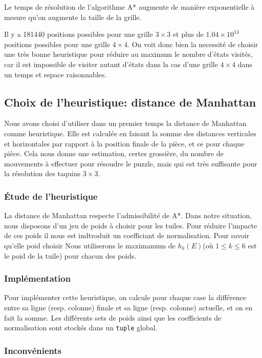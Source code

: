 \documentclass[a4paper, 12pt]{article}
\begin{document}
    Le temps de résolution de l'algorithme A* augmente de manière exponentielle à mesure qu'on augmente la taille de la grille.
    
    Il y a 181440 positions possibles pour une grille $3 \times 3$ et plus de $1.04 \times 10^{13}$ positions possibles pour une grille $4 \times 4$.
    On voit donc bien la necessité de choisir une très bonne heuristique pour réduire au maximum le nombre d'états visités, car il est impossible de visiter autant d'états dans la cas d'une grille $4 \times 4$ dans un temps et espace raisonnables.
    
    \subsection{Choix de l'heuristique: distance de Manhattan}

    Nous avons choisi d'utiliser dans un premier temps la distance de Manhattan comme heuristique. Elle est calculée en faisant la somme des distances verticales et horizontales par rapport à la position finale de la pièce, et ce pour chaque pièce.
    Cela nous donne une estimation, certes grossière, du nombre de mouvements à effectuer pour résoudre le puzzle, mais qui est très suffisante pour la résolution des taquins $3 \times 3$.

    \subsubsection{Étude de l'heuristique}
    La distance de Manhattan respecte l'admissibilité de A*. Dans notre situation, nous disposons d'un jeu de poids à choisir pour les tuiles. Pour réduire l'impacte de ces poids il nous est indtroduit un coefficiant de normalisation. Pour savoir qu'elle poid choisir Nous utiliserons le maximamum de $h_{k}(E)$(où $1 \leq k \leq 6$ est le poid de la tuile) pour chacun des poids. 
    
    \subsubsection{Implémentation}

    Pour implémenter cette heuristique, on calcule pour chaque case la différence entre sa ligne (resp. colonne) finale et sa ligne (resp. colonne) actuelle, et on en fait la somme.
    Les différents sets de poids ainsi que les coefficients de normalisation sont stockés dans un \lstinline{tuple} global.
    
    \subsubsection{Inconvénients}
\end{document}
